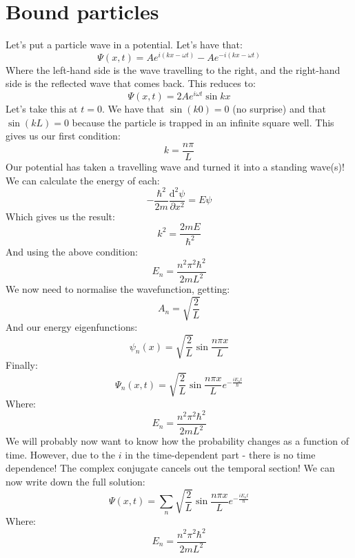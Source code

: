 \section{Bound particles}
Let's put a particle wave in a potential. Let's have that:
$$
	\Psi(x,t) = Ae^{i(kx-\omega t)} - Ae^{-i(kx-\omega t)}
$$
Where the left-hand side is the wave travelling to the right, and the right-hand
side is the reflected wave that comes back. This reduces to:
$$
	\Psi(x,t) = 2Ae^{i\omega t}\sin kx
$$
Let's take this at $t=0$. We have that $\sin(k0) = 0$ (no surprise) and that
$\sin(kL) = 0$ because the particle is trapped in an infinite square well. This
gives us our first condition:
$$
	k = \frac{n\pi}{L}
$$
Our potential has taken a travelling wave and turned it into a standing wave(s)!
We can calculate the energy of each:
$$
	-\frac{\hbar^2}{2m} \frac{\mathrm{d}^2\psi}{\partial x^2} = E\psi
$$
Which gives us the result:
$$
	k^2 = \frac{2mE}{\hbar^2}
$$
And using the above condition:
$$
	E_n = \frac{n^2\pi^2\hbar^2}{2mL^2}
$$
We now need to normalise the wavefunction, getting:
$$
	A_n = \sqrt{\frac{2}{L}}
$$
And our energy eigenfunctions:
$$
	\psi_n(x) = \sqrt{\frac{2}{L}} \sin \frac{n\pi x}{L}
$$
Finally:
$$
	\Psi_n(x,t) = \sqrt{\frac{2}{L}} \sin \frac{n\pi x}{L}
	e^{-\frac{iE_n t}{\hbar}}
$$
Where:
$$
	E_n = \frac{n^2\pi^2\hbar^2}{2mL^2}
$$
We will probably now want to know how the probability changes as a function of
time. However, due to the $i$ in the time-dependent part - there is no time
dependence! The complex conjugate cancels out the temporal section! We can now
write down the full solution:
$$
	\Psi(x,t) = \sum_n
	\sqrt{\frac{2}{L}} \sin \frac{n\pi x}{L}
	    e^{-\frac{iE_n t}{\hbar}}
$$
Where:
$$
    E_n = \frac{n^2\pi^2\hbar^2}{2mL^2}
$$
	
